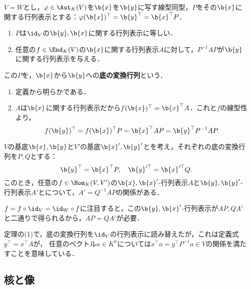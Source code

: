 \documentclass[uplatex, dvipdfmx]{jsreport}
\begin{document}
\begin{theorem}[正方行列表示の変換]
    $V=W$とし，$\varphi\in\Aut_K(V)$を$\b{x}$を$\b{y}$に写す線型同型，$P$をその$\b{x}$に関する行列表示とする：$\varphi(\b{x})^\top=\b{y}^\top=\b{x}^\top P$．
    \begin{enumerate}
        \item $P$は$\id_V$の$\b{y},\b{x}$に関する行列表示に等しい．
        \item 任意の$f\in\End_K(V)$の$\b{x}$に関する行列表示$A$に対して，$P^{-1}AP$が$\b{y}$に関する行列表示を与える．
    \end{enumerate}
    この$P$を，$\b{x}$から$\b{y}$への\textbf{底の変換行列}という．
\end{theorem}
\begin{Proof}\mbox{}
    \begin{enumerate}
        \item 定義から明らかである．
        \item $A$は$\b{x}$に関する行列表示だから$f(\b{x})^\top=\b{x}^\top A$．これと$f$の線型性より，
        \[f(\b{y})^\top=f(\b{x})^\top P=\b{x}^\top AP=\b{y}^\top P^{-1}AP.\]
    \end{enumerate}
\end{Proof}

\begin{corollary}[一般の行列表示の変換]
    $V$の基底$\b{x},\b{y}$と$V'$の基底$\b{x}',\b{y}'$とを考え，それぞれの底の変換行列を$P,Q$とする：
    \[\b{y}^\top=\b{x}^\top P,\quad \b{y}'^\top=\b{x}'^\top Q.\]
    このとき，任意の$f\in\Hom_K(V,V')$の$\b{x},\b{x}'$-行列表示$A$と$\b{y},\b{y}'$-行列表示$A'$とについて，$A'=Q^{-1}AP$の関係がある．
\end{corollary}
\begin{Proof}
    $f=f\circ\id_V=\id_W\circ f$に注目すると，この$\b{y},\b{x}'$-行列表示が$AP,QA'$と二通りで得られるから，$AP=QA'$が必要．
\end{Proof}
\begin{remarks}[基底の変換行列は係数ベクトルには反変に作用する]
    定理の(1)で，底の変換行列を$\id_V$の行列表示に読み替えたが，これは定義式$y^\top=x^\top A$が，
    任意のベクトル$a\in K^n$については$x^\top a=y^\top P^{-1}a\in V$の関係を満たすことを意味している．
\end{remarks}

\subsection{核と像}
\end{document}
